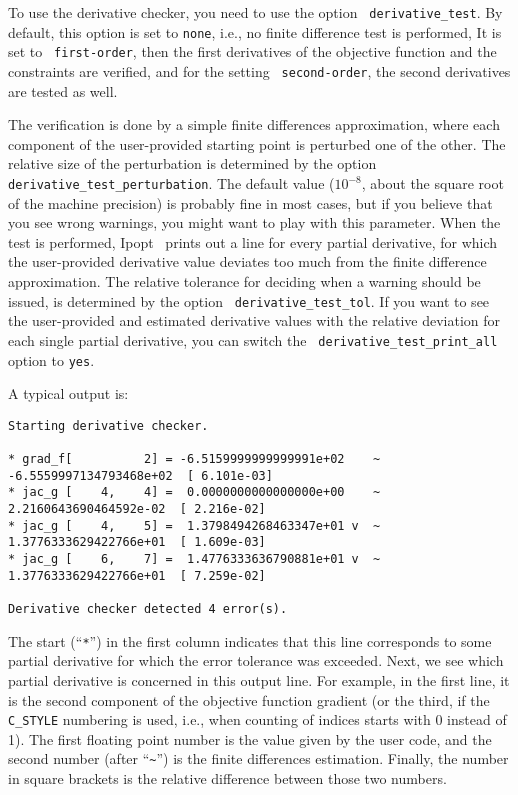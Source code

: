 \documentclass[10pt]{article}
\newcommand{\Ipopt}{{\sc Ipopt }}
\begin{document}
To use the derivative checker, you need to use the option {\tt
  derivative\_test}.  By default, this option is set to {\tt none},
i.e., no finite difference test is performed,  It is set to {\tt
  first-order}, then the first derivatives of the objective function
and the constraints are verified, and for the setting {\tt
  second-order}, the second derivatives are tested as well.

The verification is done by a simple finite differences approximation,
where each component of the user-provided starting point is perturbed
one of the other.  The relative size of the perturbation is determined
by the option {\tt derivative\_test\_perturbation}.  The default value
($10^{-8}$, about the square root of the machine precision) is
probably fine in most cases, but if you believe that you see wrong
warnings, you might want to play with this parameter.  When the test is
performed, \Ipopt\ prints out a line for every partial derivative, for
which the user-provided derivative value deviates too much from the
finite difference approximation.  The relative tolerance for deciding
when a warning should be issued, is determined by the option {\tt
  derivative\_test\_tol}.  If you want to see the user-provided and
estimated derivative values with the relative deviation for each
single partial derivative, you can switch the {\tt
  derivative\_test\_print\_all} option to {\tt yes}.

A typical output is:

\begin{footnotesize}
\begin{verbatim}
Starting derivative checker.

* grad_f[          2] = -6.5159999999999991e+02    ~ -6.5559997134793468e+02  [ 6.101e-03]
* jac_g [    4,    4] =  0.0000000000000000e+00    ~  2.2160643690464592e-02  [ 2.216e-02]
* jac_g [    4,    5] =  1.3798494268463347e+01 v  ~  1.3776333629422766e+01  [ 1.609e-03]
* jac_g [    6,    7] =  1.4776333636790881e+01 v  ~  1.3776333629422766e+01  [ 7.259e-02]

Derivative checker detected 4 error(s).
\end{verbatim}
\end{footnotesize}

The start (``\verb|*|'') in the first column indicates that this line
corresponds to some partial derivative for which the error tolerance
was exceeded.  Next, we see which partial derivative is concerned in
this output line.  For example, in the first line, it is the second
component of the objective function gradient (or the third, if the
{\tt C\_STYLE} numbering is used, i.e., when counting of indices
starts with 0 instead of 1).  The first floating point number is the
value given by the user code, and the second number (after
``\verb|~|'') is the finite differences estimation.  Finally, the
number in square brackets is the relative difference between those two
numbers.
\end{document}
